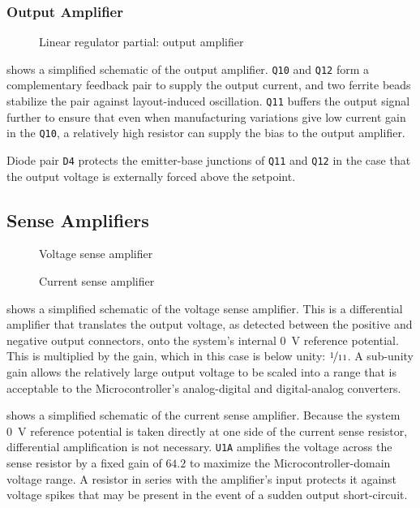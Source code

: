 \documentclass[letterpaper,twocolumn,10pt,openany,oneside,final,fleqn]{memoir}
\newcommand{\rd}[1]{\texttt{#1}}
\newcommand{\xcircuit}[1]{ \centering \textsf{  } }
\begin{document}
\subsubsection{Output Amplifier}

\begin{figure}
\xcircuit{outamp}
\caption{Linear regulator partial: output amplifier}
\label{fig:outputamp}
\end{figure}

 shows a simplified schematic of the output amplifier. \rd{Q10}
and \rd{Q12} form a complementary feedback pair to supply the output current, and
two ferrite beads stabilize the pair against layout-induced oscillation. \rd{Q11}
buffers the output signal further to ensure that even when manufacturing variations
give low current gain in the \rd{Q10}, a relatively high resistor can supply the
bias to the output amplifier.

Diode pair \rd{D4} protects the emitter-base junctions of \rd{Q11} and \rd{Q12} in
the case that the output voltage is externally forced above the setpoint.

\subsection{Sense Amplifiers}

\begin{figure}
\xcircuit{vsense}
\caption{Voltage sense amplifier}
\label{fig:vsense}
\end{figure}

\begin{figure}
\xcircuit{isense}
\caption{Current sense amplifier}
\label{fig:isense}
\end{figure}

 shows a simplified schematic of the voltage sense amplifier. This
is a differential amplifier that translates the output voltage, as detected between
the positive and negative output connectors, onto the system's internal \SI{0}{V}
reference potential. This is multiplied by the gain, which in this case is below
unity: $\nicefrac{1}{11}$. A sub-unity gain allows the relatively large output voltage
to be scaled into a range that is acceptable to the Microcontroller's analog-digital
and digital-analog converters.

 shows a simplified schematic of the current sense amplifier.
Because the system \SI{0}{V} reference potential is taken directly at one side of the
current sense resistor, differential amplification is not necessary. \rd{U1A} amplifies
the voltage across the sense resistor by a fixed gain of $64.2$ to maximize the
Microcontroller-domain voltage range. A resistor in series with the amplifier's
input protects it against voltage spikes that may be present in the event of a sudden
output short-circuit.
\end{document}
